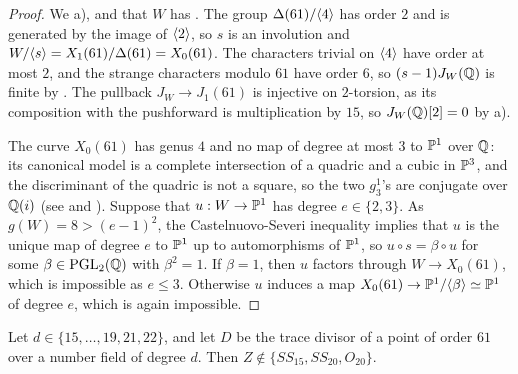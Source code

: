 \begin{proof}
We  a), and that $W$ has . The group $\Delta(61)/\langle 4\rangle$ has order $2$ and is generated by the image of $\langle 2\rangle$, so $s$ is an involution and $W/\langle s\rangle=X_1(61)/\Delta(61)=X_0(61)$. The characters trivial on $\langle 4\rangle$ have order at most $2$, and the strange characters modulo $61$ have order $6$, so $(s-1)J_W(\mathbb{Q})$ is finite by . The pullback $J_W\to J_1(61)$ is injective on $2$-torsion, as its composition with the pushforward is multiplication by $15$, so $J_W(\mathbb{Q})[2]=0$ by a).

The curve $X_0(61)$ has genus $4$ and no map of degree at most $3$ to $\mathbb{P}^1$ over $\mathbb{Q}$: its canonical model is a complete intersection of a quadric and a cubic in $\mathbb{P}^3$, and the discriminant of the quadric is not a square, so the two $g^1_3$'s are conjugate over $\mathbb{Q}(i)$ (see \cite{HS,jeon} and ). Suppose that $u:W\to\mathbb{P}^1$ has degree $e\in\{2,3\}$. As $g(W)=8>(e-1)^2$, the Castelnuovo-Severi inequality implies that $u$ is the unique map of degree $e$ to $\mathbb{P}^1$ up to automorphisms of $\mathbb{P}^1$, so $u\circ s=\beta\circ u$ for some $\beta\in\mathrm{PGL}_2(\mathbb{Q})$ with $\beta^2=1$. If $\beta=1$, then $u$ factors through $W\to X_0(61)$, which is impossible as $e\leq 3$. Otherwise $u$ induces a map $X_0(61)\to\mathbb{P}^1/\langle \beta\rangle\simeq\mathbb{P}^1$ of degree $e$, which is again impossible.
\end{proof}

\begin{proposition}\label{prop:61}
Let $d\in\{15,\dots,19,21,22\}$, and let $D$ be the trace divisor of a point of order $61$ over a number field of degree $d$. Then $Z\notin\{SS_{15},SS_{20},O_{20}\}$.
\end{proposition}

